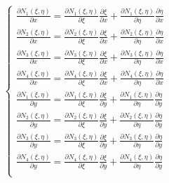 \documentclass[a4paper]{jpconf}
\begin{document}
\begin{equation}
\begin{cases}
\frac{\partial N_{1}\left(\xi,\eta\right)}{\partial x}=\frac{\partial N_{1}\left(\xi,\eta\right)}{\partial \xi}\frac{\partial \xi}{\partial x}+\frac{\partial N_{1}\left(\xi,\eta\right)}{\partial \eta}\frac{\partial \eta}{\partial x}\\
\frac{\partial N_{2}\left(\xi,\eta\right)}{\partial x}=\frac{\partial N_{2}\left(\xi,\eta\right)}{\partial \xi}\frac{\partial \xi}{\partial x}+\frac{\partial N_{2}\left(\xi,\eta\right)}{\partial \eta}\frac{\partial \eta}{\partial x}\\
\frac{\partial N_{3}\left(\xi,\eta\right)}{\partial x}=\frac{\partial N_{3}\left(\xi,\eta\right)}{\partial \xi}\frac{\partial \xi}{\partial x}+\frac{\partial N_{3}\left(\xi,\eta\right)}{\partial \eta}\frac{\partial \eta}{\partial x}\\
\frac{\partial N_{4}\left(\xi,\eta\right)}{\partial x}=\frac{\partial N_{4}\left(\xi,\eta\right)}{\partial \xi}\frac{\partial \xi}{\partial x}+\frac{\partial N_{4}\left(\xi,\eta\right)}{\partial \eta}\frac{\partial \eta}{\partial x}\\
\frac{\partial N_{1}\left(\xi,\eta\right)}{\partial y}=\frac{\partial N_{1}\left(\xi,\eta\right)}{\partial \xi}\frac{\partial \xi}{\partial y}+\frac{\partial N_{1}\left(\xi,\eta\right)}{\partial \eta}\frac{\partial \eta}{\partial y}\\
\frac{\partial N_{2}\left(\xi,\eta\right)}{\partial y}=\frac{\partial N_{2}\left(\xi,\eta\right)}{\partial \xi}\frac{\partial \xi}{\partial y}+\frac{\partial N_{2}\left(\xi,\eta\right)}{\partial \eta}\frac{\partial \eta}{\partial y}\\
\frac{\partial N_{3}\left(\xi,\eta\right)}{\partial y}=\frac{\partial N_{3}\left(\xi,\eta\right)}{\partial \xi}\frac{\partial \xi}{\partial y}+\frac{\partial N_{3}\left(\xi,\eta\right)}{\partial \eta}\frac{\partial \eta}{\partial y}\\
\frac{\partial N_{4}\left(\xi,\eta\right)}{\partial y}=\frac{\partial N_{4}\left(\xi,\eta\right)}{\partial \xi}\frac{\partial \xi}{\partial y}+\frac{\partial N_{4}\left(\xi,\eta\right)}{\partial \eta}\frac{\partial \eta}{\partial y}\\
\end{cases}
\end{equation}
\end{document}
